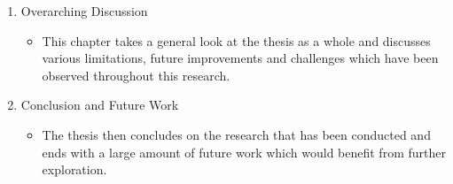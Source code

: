 \begin{enumerate}
\begin{enumerate}
    \end{enumerate}
    \item Overarching Discussion
    \begin{itemize}
        \item This chapter takes a general look at the thesis as a whole and discusses various limitations, future improvements and challenges which have been observed throughout this research.
    \end{itemize}
    \item Conclusion and Future Work
    \begin{itemize}
        \item The thesis then concludes on the research that has been conducted and ends with a large amount of future work which would benefit from further exploration.
    \end{itemize}
\end{enumerate}